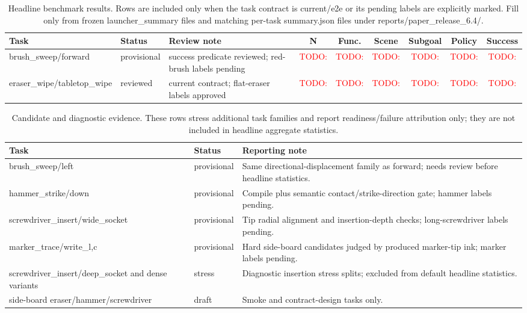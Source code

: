\documentclass[journal]{IEEEtran}
\newcommand{\todo}[1]{\textcolor{red}{TODO: #1}}
\begin{document}
\begin{table}[t]
\centering
\caption{Headline benchmark results. Rows are included only when the task
contract is current/e2e or its pending labels are explicitly marked. Fill
only from frozen launcher\_summary files and matching per-task summary.json
files under reports/paper\_release\_6.4/.}
\scriptsize
\setlength{\tabcolsep}{3pt}
\begin{tabular}{p{}p{}p{}cccccc}
\toprule
Task & Status & Review note & N & Func. & Scene & Subgoal & Policy & Success \\
\midrule
brush\_sweep/forward & provisional & success predicate reviewed; red-brush labels pending & \todo{} & \todo{} & \todo{} & \todo{} & \todo{} & \todo{} \\
eraser\_wipe/tabletop\_wipe & reviewed & current contract; flat-eraser labels approved & \todo{} & \todo{} & \todo{} & \todo{} & \todo{} & \todo{} \\
\bottomrule
\end{tabular}
\end{table}

\begin{table}[t]
\centering
\caption{Candidate and diagnostic evidence. These rows stress additional task
families and report readiness/failure attribution only; they are not included
in headline aggregate statistics.}
\begin{tabular}{p{}p{}p{}}
\toprule
Task & Status & Reporting note \\
\midrule
brush\_sweep/left & provisional & Same directional-displacement family as forward; needs review before headline statistics. \\
hammer\_strike/down & provisional & Compile plus semantic contact/strike-direction gate; hammer labels pending. \\
screwdriver\_insert/wide\_socket & provisional & Tip radial alignment and insertion-depth checks; long-screwdriver labels pending. \\
marker\_trace/write\_l,c & provisional & Hard side-board candidates judged by produced marker-tip ink; marker labels pending. \\
screwdriver\_insert/deep\_socket and dense variants & stress & Diagnostic insertion stress splits; excluded from default headline statistics. \\
side-board eraser/hammer/screwdriver & draft & Smoke and contract-design tasks only. \\
\bottomrule
\end{tabular}
\end{table}
\end{document}
